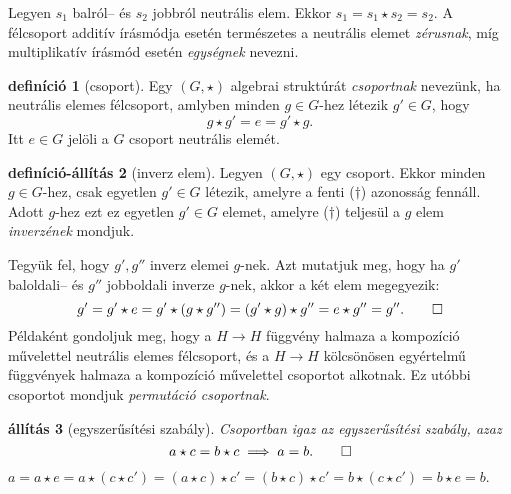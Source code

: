 \documentclass[9pt,showtrims]{memoir}
\makeatletter
\renewenvironment{proof}[1][\proofname]
    {\par\pushQED{\qed}%
    \normalfont \topsep6\p@\@plus6\p@\relax
    \trivlist
    \item[\hskip\labelsep
        \itshape
    #1\@addpunct{:}]\ignorespaces}
    {\popQED\endtrivlist\@endpefalse}
\theoremstyle{plain}
\newtheorem{proposition}{állítás}[chapter]
\theoremstyle{remark}
\theoremstyle{definition}
\newtheorem{definition}[proposition]{definíció}
\newtheorem{defprop}[proposition]{definíció-állítás}
\makeatother
\begin{document}
\begin{proof}
    Legyen $s_1$ balról-- és $s_2$ jobbról neutrális elem.
    Ekkor
    \(
        s_1=s_1\star s_2=s_2.
    \)
\end{proof}
A félcsoport additív írásmódja esetén természetes a neutrális elemet \emph{zérusnak},
míg multiplikatív írásmód esetén \emph{egységnek} nevezni.
\begin{definition}[csoport]
    Egy $\left( G,\star \right)$ algebrai struktúrát \emph{csoportnak} nevezünk,
    ha neutrális elemes félcsoport, amlyben minden $g\in G$-hez létezik $g'\in G$, hogy
    \[
        g\star g'=e=g'\star g.\tag{\dag}
    \]
    Itt $e\in G$ jelöli a $G$ csoport neutrális elemét.
\end{definition}
\begin{defprop}[inverz elem]
    Legyen $\left( G,\star \right)$ egy csoport.
    Ekkor minden $g\in G$-hez, csak egyetlen $g'\in G$ létezik, 
    amelyre a fenti ($\dag$) azonosság fennáll.
    Adott $g$-hez ezt ez egyetlen $g'\in G$ elemet, 
    amelyre ($\dag$) teljesül a $g$ elem \emph{inverzének} mondjuk.
\end{defprop}
\begin{proof}
    Tegyük fel, hogy $g',g''$ inverz elemei $g$-nek.
    Azt mutatjuk meg, hogy ha $g'$ baloldali-- és $g''$ jobboldali inverze $g$-nek,
    akkor a két elem megegyezik:
    \[
        g'=g'\star e=
        g'\star\left( g\star g'' \right)=
        \left(g'\star g\right)\star g'' =
        e\star g''=g''.\qedhere
    \]
\end{proof}
Példaként gondoljuk meg, hogy a $H\to H$ függvény halmaza a kompozíció művelettel
neutrális elemes félcsoport, és a $H\to H$ kölcsönösen egyértelmű függvények halmaza a kompozíció művelettel csoportot alkotnak. 
Ez utóbbi csoportot mondjuk \emph{permutáció csoportnak}.
\begin{proposition}[egyszerűsítési szabály]
    Csoportban igaz az egyszerűsítési szabály, azaz
    \[
        a\star c=b\star c\implies a=b.\qedhere
    \]
\end{proposition}
\begin{proof}
    \begin{math}
        a=a\star e
        =
        a\star \left( c\star c'\right)=
        \left( a\star c \right)\star c'=
        \left( b\star c \right)\star c'=
        b\star\left( c\star c' \right)=
        b\star e=
        b.
    \end{math}
\end{proof}
\end{document}

